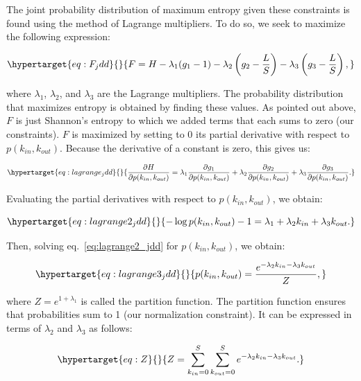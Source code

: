 \documentclass[10pt,oneside]{article}
\begin{document}
The joint probability distribution of maximum entropy given these
constraints is found using the method of Lagrange multipliers. To do so,
we seek to maximize the following expression:

\begin{equation}\protect\hypertarget{eq:F_jdd}{}{F = H - \lambda_1(g_1-1)-\lambda_2\left( g_2-\frac{L}{S}\right) - \lambda_3 \left( g_3-\frac{L}{S}\right),}\label{eq:F_jdd}\end{equation}

where \(\lambda_1\), \(\lambda_2\), and \(\lambda_3\) are the Lagrange
multipliers. The probability distribution that maximizes entropy is
obtained by finding these values. As pointed out above, \(F\) is just
Shannon's entropy to which we added terms that each sums to zero (our
constraints). \(F\) is maximized by setting to 0 its partial derivative
with respect to \(p(k_{in},k_{out})\). Because the derivative of a
constant is zero, this gives us:

\begin{equation}\protect\hypertarget{eq:lagrange_jdd}{}{\frac{\partial H}{\partial p(k_{in},k_{out})} = \lambda_1 \frac{\partial g_1}{\partial p(k_{in},k_{out})} + \lambda_2 \frac{\partial g_2}{\partial p(k_{in},k_{out})}+ \lambda_3 \frac{\partial g_3}{\partial p(k_{in},k_{out})}.}\label{eq:lagrange_jdd}\end{equation}

Evaluating the partial derivatives with respect to
\(p(k_{in},k_{out})\), we obtain:

\begin{equation}\protect\hypertarget{eq:lagrange2_jdd}{}{-\log p(k_{in},k_{out}) - 1 = \lambda_1 + \lambda_2 k_{in} + \lambda_3 k_{out}.}\label{eq:lagrange2_jdd}\end{equation}

Then, solving eq.~\ref{eq:lagrange2_jdd} for \(p(k_{in},k_{out})\), we
obtain:

\begin{equation}\protect\hypertarget{eq:lagrange3_jdd}{}{p(k_{in},k_{out}) = \frac{e^{-\lambda_2k_{in}-\lambda_3k_{out}}}{Z},}\label{eq:lagrange3_jdd}\end{equation}

where \(Z = e^{1+\lambda_1}\) is called the partition function. The
partition function ensures that probabilities sum to 1 (our
normalization constraint). It can be expressed in terms of \(\lambda_2\)
and \(\lambda_3\) as follows:

\begin{equation}\protect\hypertarget{eq:Z}{}{Z = \sum_{k_{in}=0}^S\sum_{k_{out}=0}^S e^{-\lambda_2k_{in}-\lambda_3k_{out}}.}\label{eq:Z}\end{equation}
\end{document}
